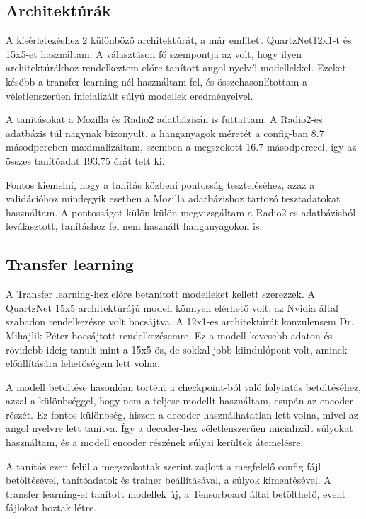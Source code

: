 \subsection{Architektúrák}

A kísérletezéshez 2 különböző architektúrát, a már említett QuartzNet12x1-t és 15x5-et használtam. A választáson fő szempontja az volt, hogy ilyen architektúrákhoz rendelkeztem előre tanított angol nyelvű modellekkel. Ezeket később a transfer learning-nél használtam fel, és összehasonlítottam a véletlenszerűen inicializált súlyú modellek eredményeivel.

A tanításokat a Mozilla és Radio2 adatbázisán is futtattam. A Radio2-es adatbázis túl nagynak bizonyult, a hanganyagok méretét a config-ban 8.7 másodpercben maximalizáltam, szemben a megszokott 16.7 másodperccel, így az összes tanítóadat 193.75 órát tett ki.

Fontos kiemelni, hogy a tanítás közbeni pontosság teszteléséhez, azaz a validációhoz mindegyik esetben a Mozilla adatbázishoz tartozó tesztadatokat használtam. A pontosságot külön-külön megvizsgáltam a Radio2-es adatbázisból leválasztott, tanításhoz fel nem használt hanganyagokon is.

\subsection{Transfer learning}

A Transfer learning-hez előre betanított modelleket kellett szerezzek. A QuartzNet 15x5 architektúrájú modell könnyen elérhető volt, az Nvidia által szabadon rendelkezésre volt bocsájtva. A 12x1-es architektúrát konzulensem Dr. Mihajlik Péter bocsájtott rendelkezésemre. Ez a modell kevesebb adaton és rövidebb ideig tanult mint a 15x5-ös, de sokkal jobb kiindulópont volt, aminek előállítására lehetőségem lett volna.

A modell betöltése hasonlóan történt a checkpoint-ból való folytatás betöltéséhez, azzal a különbséggel, hogy nem a teljese modellt használtam, csupán az encoder részét. Ez fontos különbség, hiszen a decoder használhatatlan lett volna, mivel az angol nyelvre lett tanítva. Így a decoder-hez véletlenszerűen inicializált súlyokat használtam, és a modell encoder részének súlyai kerültek átemelésre.

A tanítás ezen felül a megszokottak szerint zajlott a megfelelő config fájl betöltésével, tanítóadatok és trainer beállításával, a súlyok kimentésével. A transfer learning-el tanított modellek új, a Tensorboard által betölthető, event fájlokat hoztak létre.